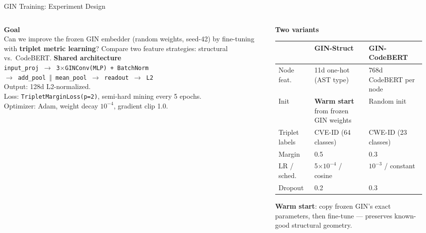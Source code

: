 \documentclass[aspectratio=169,10pt]{beamer}
\begin{document}
\begin{frame}[fragile]{GIN Training: Experiment Design}
\begin{columns}[T]
\begin{column}{0.50\textwidth}

  \textbf{Goal}\\[3pt]
  {\small Can we improve the frozen GIN embedder (random weights,
  seed-42) by fine-tuning with \textbf{triplet metric learning}?
  Compare two feature strategies: structural vs.\ CodeBERT.}
  \vspace{0.5em}
  \textbf{Shared architecture}\\[2pt]
  {\scriptsize
  \texttt{input\_proj $\to$ 3$\times$GINConv(MLP) + BatchNorm}\\
  \texttt{$\to$ add\_pool $\Vert$ mean\_pool $\to$ readout $\to$ L2}\\[3pt]
  Output: 128d L2-normalized.\\
  Loss: \texttt{TripletMarginLoss(p=2)}, semi-hard mining every 5 epochs.\\
  Optimizer: Adam, weight decay $10^{-4}$, gradient clip 1.0.}

\end{column}
\begin{column}{0.47\textwidth}

  \textbf{Two variants}

  \vspace{0.2em}
  {\scriptsize
  \renewcommand{\arraystretch}{1.2}
  \setlength{\tabcolsep}{2.5pt}
  \begin{tabular}{l p{2.8cm} p{2.8cm}}
    \toprule
    & \textbf{GIN-Struct} & \textbf{GIN-CodeBERT} \\
    \midrule
    Node feat.
      & 11d one-hot (AST type)
      & 768d CodeBERT per node \\
    Init
      & \textbf{Warm start} from frozen GIN weights
      & Random init \\
    Triplet labels
      & CVE-ID (64 classes)
      & CWE-ID (23 classes) \\
    Margin
      & 0.5 & 0.3 \\
    LR / sched.
      & 5$\times 10^{-4}$ / cosine
      & $10^{-3}$ / constant \\
    Dropout
      & 0.2 & 0.3 \\
    \bottomrule
  \end{tabular}}

  \vspace{0.4em}
  {\scriptsize\textcolor{c1}{}
  \textbf{Warm start}: copy frozen GIN's exact parameters,
  then fine-tune --- preserves known-good structural geometry.}

\end{column}
\end{columns}
\end{frame}
\end{document}
